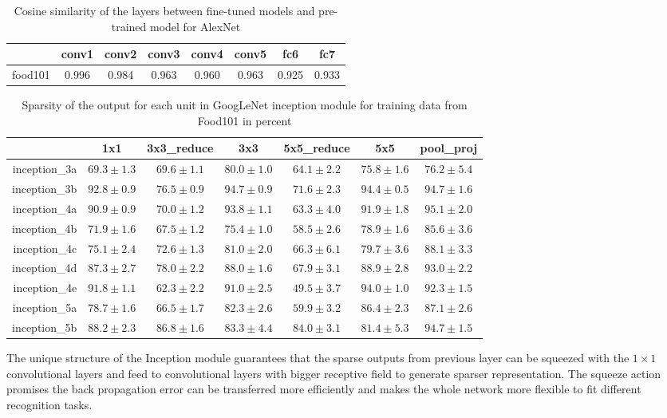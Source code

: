 \begin{table}[htbp]
  \centering
  \caption{Cosine similarity of the layers between fine-tuned models and pre-trained model for AlexNet}
    \begin{tabular}{r|ccccccc}
    \toprule
          & conv1 & conv2 & conv3 & conv4 & conv5 & fc6   & fc7 \\
    \midrule
    food101 & 0.996 & 0.984 & 0.963 & 0.960 & 0.963 & 0.925 & 0.933 \\
    \bottomrule
    \end{tabular}%
  \label{tab:cosa}%
\end{table}%

\begin{table}[htbp]
  \centering
  \caption{Sparsity of the output for each unit in GoogLeNet inception module for training data from Food101 in percent}
    \begin{tabular}{r|cccccc}
    \toprule
          & 1x1  & 3x3\_reduce & 3x3  & 5x5\_reduce & 5x5  & pool\_proj  \\
    \midrule
    inception\_3a & $69.3\pm 1.3$  & $69.6 \pm 1.1$  & $80.0\pm  1.0$& $64.1\pm  2.2$& $75.8\pm  1.6$& $76.2\pm 5.4$\\
    inception\_3b & $92.8 \pm 0.9$&$ 76.5 \pm 0.9$& $94.7\pm 0.9 $&$ 71.6 \pm 2.3 $&$ 94.4\pm 0.5 $&$ 94.7 \pm 1.6$\\
    inception\_4a & $90.9 \pm 0.9$& $70.0\pm 1.2 $& $93.8\pm 1.1 $& $63.3\pm 4.0 $& $91.9\pm 1.8 $& $95.1\pm 2.0$\\
    inception\_4b & $71.9 \pm 1.6$& $67.5\pm 1.2$ & $75.4\pm  1.0$& $58.5 \pm 2.6$& $78.9\pm  1.6$& $85.6\pm 3.6$\\
    inception\_4c & $75.1 \pm 2.4$& $72.6 \pm 1.3$& $81.0\pm 2.0$ & $66.3\pm 6.1 $& $79.7 \pm 3.6$& $88.1\pm 3.3$\\
    inception\_4d & $87.3 \pm 2.7$& $78.0 \pm 2.2$& $88.0\pm 1.6$& $67.9\pm 3.1 $& $88.9\pm 2.8 $& $93.0\pm 2.2$\\
    inception\_4e & $91.8\pm  1.1$& $62.3\pm 2.2 $& $91.0\pm 2.5 $& $49.5 \pm 3.7$& $94.0 \pm 1.0$& $92.3\pm 1.5$\\
    inception\_5a & $78.7 \pm 1.6$& $66.5\pm  1.7$& $82.3\pm 2.6 $& $59.9\pm 3.2 $& $86.4\pm 2.3 $& $87.1\pm 2.6$\\
    inception\_5b & $88.2\pm 2.3 $& $86.8 \pm 1.6$&$ 83.3\pm 4.4$ & $84.0\pm 3.1 $& $81.4\pm 5.3$  & $94.7\pm 1.5$\\
    \bottomrule
    \end{tabular}%
  \label{tab:sparse}%
\end{table}%

The unique structure of the Inception module guarantees that the sparse outputs from previous layer can be squeezed with the $1\times 1$ convolutional layers and feed to convolutional layers with bigger receptive field to generate sparser representation. The squeeze action promises the back propagation error can be transferred more efficiently and makes the whole network more flexible to fit different recognition tasks.

